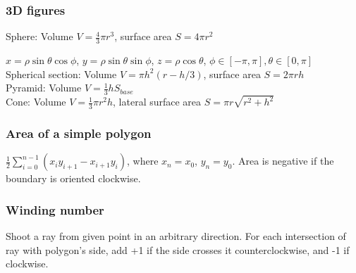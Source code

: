 \documentclass[a4paper,13pt]{article}
\newcommand\includefile[3]{
   \subsection{#1}
   \begin{multicols}{2}
    
   \end{multicols}
}
\begin{document}
\subsubsection{3D figures}
Sphere: Volume $V = \frac{4}{3}\pi r^3$, surface area $S = 4\pi r^2$

$x = \rho \sin \theta \cos\phi$, $y = \rho \sin\theta\sin\phi$, $z = \rho\cos\theta$, $\phi \in [-\pi,\pi], \theta \in [0,\pi]$\\
Spherical section: Volume $V = \pi h^2(r - h/3)$, surface area $S = 2\pi rh$\\
Pyramid: Volume $V = \frac{1}{3}h S_{base}$\\
Cone: Volume $V = \frac{1}{3} \pi r^2h$, lateral surface area $S = \pi r \sqrt{r^2 + h^2}$

\subsubsection{Area of a simple polygon}
$\frac{1}{2}\sum_{i=0}^{n-1}(x_iy_{i+1} - x_{i+1}y_i)$, where $x_n = x_0$, $y_n = y_0$.
Area is negative if the boundary is oriented clockwise.

\subsubsection{Winding number}
Shoot a ray from given point in an arbitrary direction. For each intersection of ray with polygon’s side, add +1 if the side crosses it counterclockwise, and -1 if clockwise.

%
%
%
\end{document}
